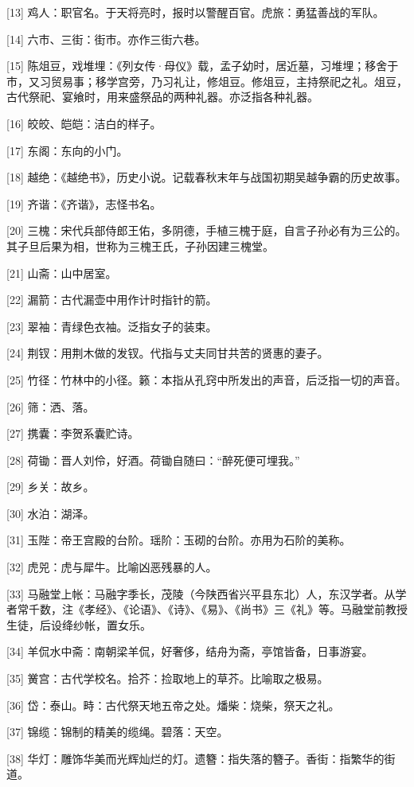 \documentclass[12pt,UTF8]{ctexbook}
\begin{document}
[13] 鸡人：职官名。于天将亮时，报时以警醒百官。虎旅：勇猛善战的军队。

[14] 六市、三街：街市。亦作三街六巷。

[15] 陈俎豆，戏堆埋：《列女传·母仪》载，孟子幼时，居近墓，习堆埋；移舍于市，又习贸易事；移学宫旁，乃习礼让，修俎豆。修俎豆，主持祭祀之礼。俎豆，古代祭祀、宴飨时，用来盛祭品的两种礼器。亦泛指各种礼器。

[16] 皎皎、皑皑：洁白的样子。

[17] 东阁：东向的小门。

[18] 越绝：《越绝书》，历史小说。记载春秋末年与战国初期吴越争霸的历史故事。

[19] 齐谐：《齐谐》，志怪书名。

[20] 三槐：宋代兵部侍郎王佑，多阴德，手植三槐于庭，自言子孙必有为三公的。其子旦后果为相，世称为三槐王氏，子孙因建三槐堂。

[21] 山斋：山中居室。

[22] 漏箭：古代漏壶中用作计时指针的箭。

[23] 翠袖：青绿色衣袖。泛指女子的装束。

[24] 荆钗：用荆木做的发钗。代指与丈夫同甘共苦的贤惠的妻子。

[25] 竹径：竹林中的小径。籁：本指从孔窍中所发出的声音，后泛指一切的声音。

[26] 筛：洒、落。

[27] 携囊：李贺系囊贮诗。

[28] 荷锄：晋人刘伶，好酒。荷锄自随曰：“醉死便可埋我。”

[29] 乡关：故乡。

[30] 水泊：湖泽。

[31] 玉陛：帝王宫殿的台阶。瑶阶：玉砌的台阶。亦用为石阶的美称。

[32] 虎兕：虎与犀牛。比喻凶恶残暴的人。

[33] 马融堂上帐：马融字季长，茂陵（今陕西省兴平县东北）人，东汉学者。从学者常千数，注《孝经》、《论语》、《诗》、《易》、《尚书》三《礼》等。马融堂前教授生徒，后设绛纱帐，置女乐。

[34] 羊侃水中斋：南朝梁羊侃，好奢侈，结舟为斋，亭馆皆备，日事游宴。

[35] 黉宫：古代学校名。拾芥：捡取地上的草芥。比喻取之极易。

[36] 岱：泰山。畤：古代祭天地五帝之处。燔柴：烧柴，祭天之礼。

[37] 锦缆：锦制的精美的缆绳。碧落：天空。

[38] 华灯：雕饰华美而光辉灿烂的灯。遗簪：指失落的簪子。香街：指繁华的街道。
\end{document}
